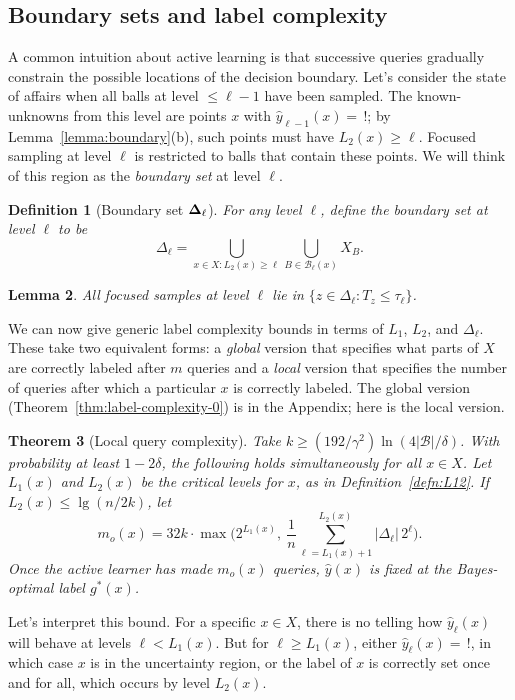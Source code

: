 \documentclass[twoside]{article}
\def\B{{\mathcal B}}
\def\yh{{\widehat{y}}}
\newtheorem{thm}{Theorem}
\newtheorem{lemma}[thm]{Lemma}
\newtheorem{defn}[thm]{Definition}
\begin{document}
\subsection{Boundary sets and label complexity}

A common intuition about active learning is that successive queries gradually constrain the possible locations of the decision boundary. Let's consider the state of affairs when all balls at level $\leq \ell - 1$ have been sampled. The known-unknowns from this level are points $x$ with $\yh_{\ell-1}(x) = \, !$; by Lemma~\ref{lemma:boundary}(b), such points must have $L_2(x) \geq \ell$. Focused sampling at level $\ell$ is restricted to balls that contain these points. We will think of this region as the \emph{boundary set} at level $\ell$.
\begin{defn}[Boundary set $\bf \Delta_\ell$]
For any level $\ell$, define the \emph{boundary set} at level $\ell$ to be
\begin{equation}
\Delta_\ell 
= \bigcup_{x \in X: L_2(x) \geq \ell} \bigcup_{B \in \B_{\ell}(x)} X_B 
.
\label{eq:sampling-region}
\end{equation}
\end{defn}
\begin{lemma}
All focused samples at level $\ell$ lie in $\{z \in \Delta_\ell: T_z \leq \tau_\ell \}$.
\label{lemma:focused}
\end{lemma}

We can now give generic label complexity bounds in terms of $L_1$, $L_2$, and $\Delta_\ell$. These take two equivalent forms: a \emph{global} version that specifies what parts of $X$ are correctly labeled after $m$ queries and a \emph{local} version that specifies the number of queries after which a particular $x$ is correctly labeled. The global version (Theorem~\ref{thm:label-complexity-0}) is in the Appendix; here is the local version.

\begin{thm}[Local query complexity] \label{thm:queryComplexity}
Take $k \geq (192/\gamma^2) \ln (4 |\B|/\delta)$. With probability at least $1-2\delta$, the following holds simultaneously for all $x \in X$. Let $L_1(x)$ and $L_2(x)$ be the critical levels for $x$, as in Definition~\ref{defn:L12}. If $L_2(x) \leq \lg (n/2k)$, let
\[
m_o(x) = 32k \cdot \max\bigg( 2^{L_1(x)}, \ \frac{1}{n} \sum_{\ell=L_1(x)+1}^{L_2(x)} |\Delta_\ell| \, 2^\ell\bigg) .
\]
Once the active learner has made $m_o(x)$ queries, $\yh(x)$ is fixed at the Bayes-optimal label $g^*(x)$.
\label{thm:label-complexity}
\end{thm}
Let's interpret this bound. For a specific $x \in X$, there is no telling how $\yh_\ell(x)$ will behave at levels $\ell < L_1(x)$. But for $\ell \geq L_1(x)$, either $\yh_\ell(x) = \, !$, in which case $x$ is in the uncertainty region, or the label of $x$ is correctly set once and for all, which occurs by level $L_2(x)$. 
\end{document}
